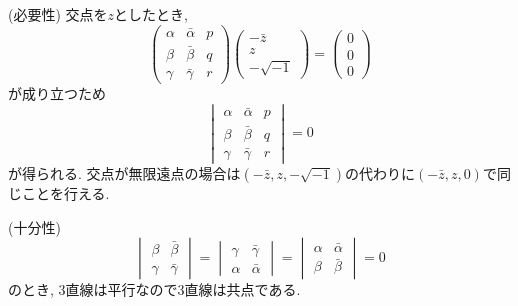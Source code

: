 \begin{prf*}
(必要性)
交点を$z$としたとき,
\[
\begin{pmatrix}\alpha&\bar\alpha&p\\\beta&\bar\beta&q\\\gamma&\bar\gamma&r\end{pmatrix}
\begin{pmatrix}-\bar z\\z\\-\sqrt{-1}\end{pmatrix}
=\begin{pmatrix}0\\0\\0\end{pmatrix}
\]
が成り立つため
\[
\begin{vmatrix}\alpha&\bar\alpha&p\\\beta&\bar\beta&q\\\gamma&\bar\gamma&r\end{vmatrix}=0
\]
が得られる.
交点が無限遠点の場合は$(-\bar{z},z,-\sqrt{-1})$の代わりに$(-\bar{z},z,0)$で同じことを行える.

(十分性)
\[
\begin{vmatrix}\beta&\bar\beta\\\gamma&\bar\gamma\end{vmatrix}
=\begin{vmatrix}\gamma&\bar\gamma\\\alpha&\bar\alpha\end{vmatrix}
=\begin{vmatrix}\alpha&\bar\alpha\\\beta&\bar\beta\end{vmatrix}
=0
\]
のとき, $3$直線は平行なので$3$直線は共点である.


\end{prf*}
